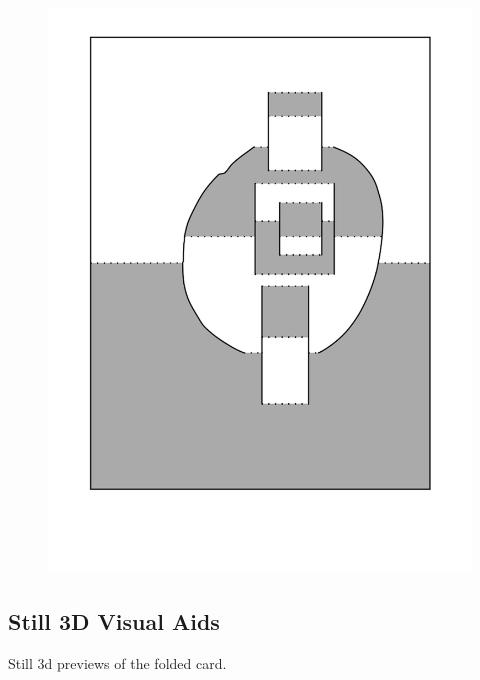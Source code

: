 \begin{figure}[htbp]
\centering
\includegraphics{figures/92_Appendix_Visual_Aids_Materials/shaded_card5.png}
\caption{}
\end{figure}

\clearpage

\subsection{Still 3D Visual Aids}\label{still-3d-visual-aids}

Still 3d previews of the folded card.

